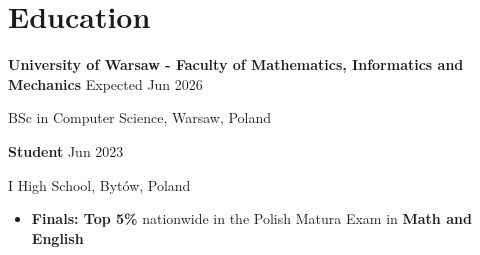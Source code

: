 \renewcommand{\subsection}[3]{
    \noindent\textbf{#1}  \emph{#2} \hfill #3 \break
}

\section{Education}
\subsection{University of Warsaw - Faculty of Mathematics, Informatics and Mechanics}{}{Expected Jun 2026}
BSc in Computer Science, Warsaw, Poland \hfill

\subsection{Student}{}{Jun 2023}
I High School, Bytów, Poland \hfill
\begin{itemize}
    \item \textbf{Finals: Top 5\%} nationwide in the Polish Matura Exam in \textbf {Math and English}
\end{itemize}


\vspace{1em}